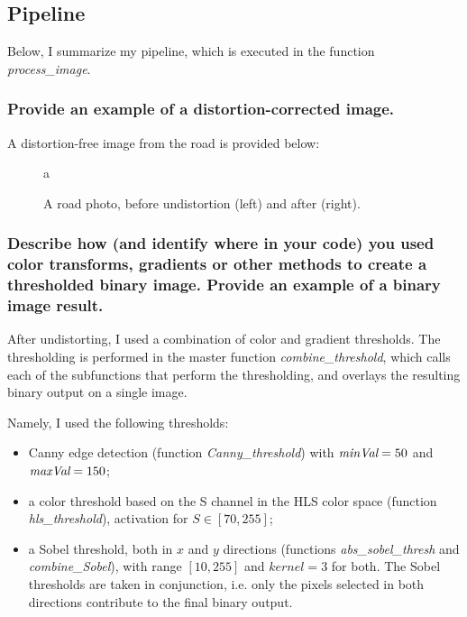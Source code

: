 \documentclass[a4paper,10pt]{article}
\begin{document}
\subsection{Pipeline}

Below, I summarize my pipeline, which is executed in the function \emph{process\_image}.

\subsubsection{Provide an example of a distortion-corrected image.}

A distortion-free image from the road is provided below:

\begin{figure}[h]
  \begin{center}
    a
    \quad
  \caption{A road photo, before undistortion (left) and after (right).}
\end{center}
\end{figure}

\subsubsection{Describe how (and identify where in your code) you used color transforms, gradients or other methods to create a thresholded binary image. 
Provide an example of a binary image result.}

After undistorting, I used a combination of color and gradient thresholds. The thresholding is performed in the master function \emph{combine\_threshold},
which calls each of the subfunctions that perform the thresholding, and overlays the resulting binary output on a single image.

Namely, I used the following thresholds:
%
\begin{itemize}
  \item Canny edge detection (function \emph{Canny\_threshold}) with $\emph{minVal}=50$ and  $\emph{maxVal}=150$;
  \item a color threshold based on the S channel in the HLS color space (function \emph{hls\_threshold}), activation for $S \in [70,255]$;
  \item a Sobel threshold, both in $x$ and $y$ directions (functions \emph{abs\_sobel\_thresh} and \emph{combine\_Sobel}), with range $[10,255]$ and $kernel=3$
    for both. The Sobel thresholds are taken in conjunction, i.e. only the pixels selected in both directions contribute to the final binary output.
\end{itemize}
\end{document}
